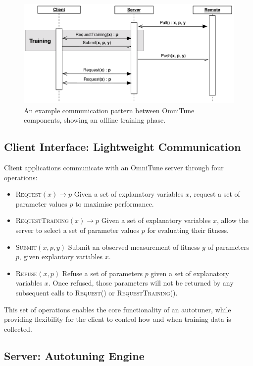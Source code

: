 \begin{figure}
\centering
\includegraphics[width=\textwidth]{img/omnitune-comms.pdf}
\caption{%
  An example communication pattern between OmniTune components,
  showing an offline training phase.%
}
\label{fig:omnitune-comms}
\end{figure}


\subsection{Client Interface: Lightweight Communication}

Client applications communicate with an OmniTune server through four
operations:

\begin{itemize}
\item \textsc{Request}$(x) \to p$ Given a set of explanatory variables
  $x$, request a set of parameter values $p$ to maximise performance.
\item \textsc{RequestTraining}$(x) \to p$ Given a set of explanatory
  variables $x$, allow the server to select a set of parameter values
  $p$ for evaluating their fitness.
\item \textsc{Submit}$(x, p, y)$ Submit an observed measurement of
  fitness $y$ of parameters $p$, given explantory variables $x$.
\item \textsc{Refuse}$(x, p)$ Refuse a set of parameters $p$ given a
  set of explanatory variables $x$. Once refused, those parameters
  will not be returned by any subsequent calls to \textsc{Request()}
  or \textsc{RequestTraining()}.
\end{itemize}

This set of operations enables the core functionality of an autotuner,
while providing flexibility for the client to control how and when
training data is collected.


\subsection{Server: Autotuning Engine}

